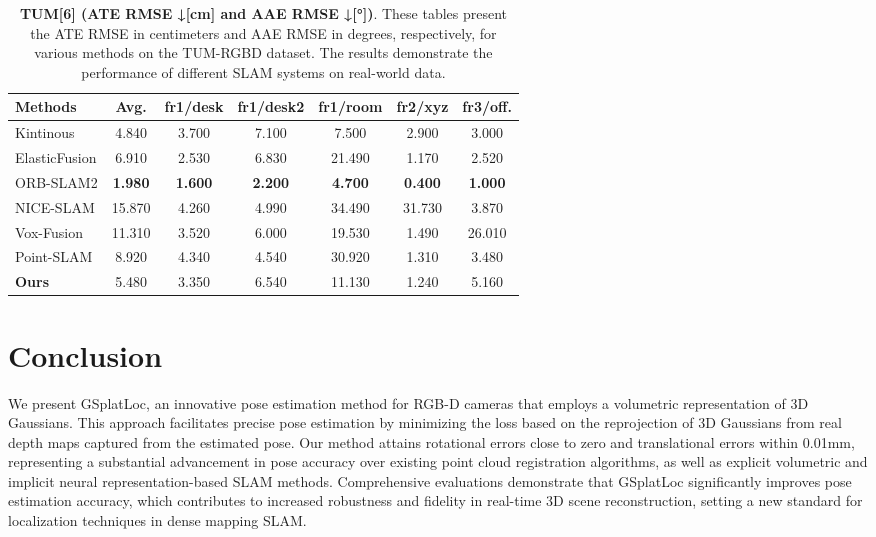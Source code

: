 \documentclass[twocolumn]{article} %
\begin{document}
\begin{table}[htbp]
\renewcommand{\thetable}{\textbf{\arabic{table}}}
\renewcommand{\tablename}{\textbf{Table}}
\centering
\caption{\textbf{TUM[6] (ATE RMSE ↓[cm] and AAE RMSE ↓[°])}. These tables present the ATE RMSE in centimeters and AAE RMSE in degrees, respectively, for various methods on the TUM-RGBD dataset. The results demonstrate the performance of different SLAM systems on real-world data.}
\label{table:_textbf_tum_6_ate_rm}
\begin{adjustbox}{max width=\columnwidth,max height=!,center}
\begin{tabular}{lcccccc}
\toprule
\textbf{Methods} & \textbf{Avg.} & \textbf{fr1/desk} & \textbf{fr1/desk2} & \textbf{fr1/room} & \textbf{fr2/xyz} & \textbf{fr3/off.}\\
\midrule
Kintinous & \cellcolor{yellow!30}4.840 & 3.700 & 7.100 & \cellcolor{yellow!30}7.500 & 2.900 & \cellcolor{lime!50}3.000\\
ElasticFusion & 6.910 & \cellcolor{yellow!30}2.530 & 6.830 & 21.490 & \cellcolor{yellow!30}1.170 & \cellcolor{yellow!30}2.520\\
ORB-SLAM2 & \cellcolor{green!30}\textbf{1.980} & \cellcolor{green!30}\textbf{1.600} & \cellcolor{green!30}\textbf{2.200} & \cellcolor{green!30}\textbf{4.700} & \cellcolor{green!30}\textbf{0.400} & \cellcolor{green!30}\textbf{1.000}\\
NICE-SLAM & 15.870 & 4.260 & \cellcolor{lime!50}4.990 & 34.490 & 31.730 & 3.870\\
Vox-Fusion & 11.310 & 3.520 & 6.000 & 19.530 & 1.490 & 26.010\\
Point-SLAM & 8.920 & 4.340 & \cellcolor{yellow!30}4.540 & 30.920 & 1.310 & 3.480\\
\midrule
\textbf{Ours} & \cellcolor{lime!50}5.480 & \cellcolor{lime!50}3.350 & 6.540 & \cellcolor{lime!50}11.130 & \cellcolor{lime!50}1.240 & 5.160\\
\bottomrule
\end{tabular}
\end{adjustbox}
\end{table}

\section{Conclusion}\label{conclusion}

We present GSplatLoc, an innovative pose estimation method for RGB-D
cameras that employs a volumetric representation of 3D Gaussians. This
approach facilitates precise pose estimation by minimizing the loss
based on the reprojection of 3D Gaussians from real depth maps captured
from the estimated pose. Our method attains rotational errors close to
zero and translational errors within 0.01mm, representing a substantial
advancement in pose accuracy over existing point cloud registration
algorithms, as well as explicit volumetric and implicit neural
representation-based SLAM methods. Comprehensive evaluations demonstrate
that GSplatLoc significantly improves pose estimation accuracy, which
contributes to increased robustness and fidelity in real-time 3D scene
reconstruction, setting a new standard for localization techniques in
dense mapping SLAM.
\end{document}
